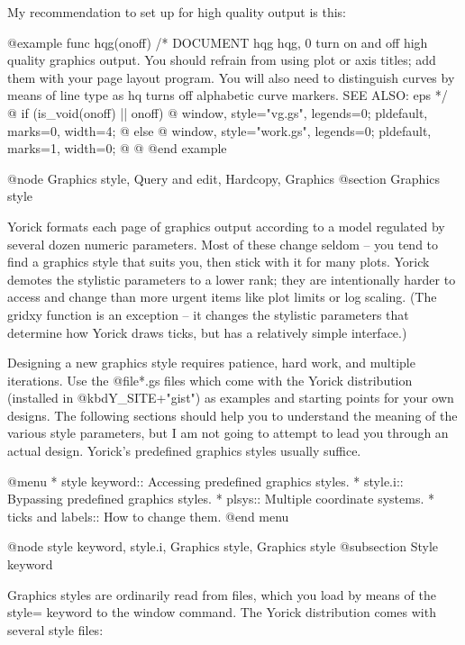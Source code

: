 My recommendation to set up for high quality output is this:

@example
func hqg(onoff)
/* DOCUMENT hqg
            hqg, 0
     turn on and off high quality graphics output.  You should
     refrain from using plot or axis titles; add them with your
     page layout program.  You will also need to distinguish
     curves by means of line type as hq turns off alphabetic
     curve markers.
   SEE ALSO: eps
 */
@{
  if (is_void(onoff) || onoff) @{
    window, style="vg.gs", legends=0;
    pldefault, marks=0, width=4;
  @} else @{
    window, style="work.gs", legends=0;
    pldefault, marks=1, width=0;
  @}
@}
@end example

@node Graphics style, Query and edit, Hardcopy, Graphics
@section Graphics style

Yorick formats each page of graphics output according to a model
regulated by several dozen numeric parameters.  Most of these change
seldom -- you tend to find a graphics style that suits you, then stick
with it for many plots.  Yorick demotes the stylistic parameters to a
lower rank; they are intentionally harder to access and change than
more urgent items like plot limits or log scaling.  (The gridxy
function is an exception -- it changes the stylistic parameters that
determine how Yorick draws ticks, but has a relatively simple
interface.)

Designing a new graphics style requires patience, hard work, and
multiple iterations.  Use the @file{*.gs} files which come with the
Yorick distribution (installed in @kbd{Y_SITE+"gist"}) as examples and
starting points for your own designs.  The following sections should
help you to understand the meaning of the various style parameters, but
I am not going to attempt to lead you through an actual design.
Yorick's predefined graphics styles usually suffice.

@menu
* style keyword::               Accessing predefined graphics styles.
* style.i::                     Bypassing predefined graphics styles.
* plsys::                       Multiple coordinate systems.
* ticks and labels::            How to change them.
@end menu

@node style keyword, style.i, Graphics style, Graphics style
@subsection Style keyword

Graphics styles are ordinarily read from files, which you load by
means of the style= keyword to the window command.  The Yorick
distribution comes with several style files:

